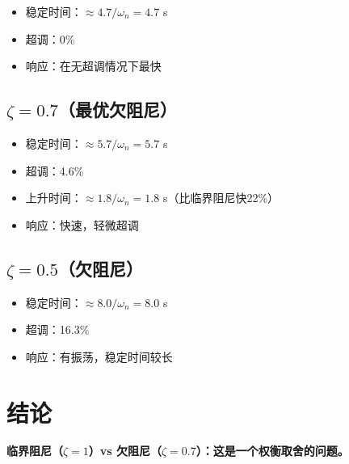 \documentclass[12pt,a4paper]{article}
\begin{document}
\begin{itemize}
\item 稳定时间：$\approx 4.7/\omega_n = 4.7$ s
\item 超调：0\%
\item 响应：在无超调情况下最快
\end{itemize}

\subsection{$\zeta = 0.7$（最优欠阻尼）}

\begin{itemize}
\item 稳定时间：$\approx 5.7/\omega_n = 5.7$ s
\item 超调：4.6\%
\item 上升时间：$\approx 1.8/\omega_n = 1.8$ s（比临界阻尼快22\%）
\item 响应：快速，轻微超调
\end{itemize}

\subsection{$\zeta = 0.5$（欠阻尼）}

\begin{itemize}
\item 稳定时间：$\approx 8.0/\omega_n = 8.0$ s
\item 超调：16.3\%
\item 响应：有振荡，稳定时间较长
\end{itemize}

\section{结论}

\textbf{临界阻尼（$\zeta = 1$）vs 欠阻尼（$\zeta = 0.7$）：这是一个权衡取舍的问题。}
\end{document}

